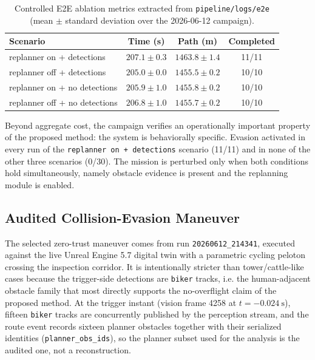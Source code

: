 \documentclass[a4paper,11pt]{article}
\begin{document}
\begin{table}[t]
    \centering
    \caption{Controlled E2E ablation metrics extracted from \texttt{pipeline/logs/e2e} (mean $\pm$ standard deviation over the 2026-06-12 campaign).}
    \label{tab:e2e}
    \small
    \begin{tabularx}{\linewidth}{@{}Y c c c@{}}
        \toprule
        \textbf{Scenario} & {\textbf{Time (s)}} & {\textbf{Path (m)}} & \textbf{Completed} \\
        \midrule
        replanner on + detections & $207.1 \pm 0.3$ & $1463.8 \pm 1.4$ & 11/11 \\
        replanner off + detections & $205.0 \pm 0.0$ & $1455.5 \pm 0.2$ & 10/10 \\
        replanner on + no detections & $205.9 \pm 1.0$ & $1455.8 \pm 0.2$ & 10/10 \\
        replanner off + no detections & $206.8 \pm 1.0$ & $1455.7 \pm 0.2$ & 10/10 \\
        \bottomrule
    \end{tabularx}
\end{table}

Beyond aggregate cost, the campaign verifies an operationally important property of the proposed method: the system is behaviorally specific. Evasion activated in every run of the \texttt{replanner on + detections} scenario (11/11) and in none of the other three scenarios (0/30). The mission is perturbed only when both conditions hold simultaneously, namely obstacle evidence is present and the replanning module is enabled.

\subsection{Audited Collision-Evasion Maneuver}

The selected zero-trust maneuver comes from run \texttt{20260612\_214341}, executed against the live Unreal Engine 5.7 digital twin with a parametric cycling peloton crossing the inspection corridor. It is intentionally stricter than tower/cattle-like cases because the trigger-side detections are \texttt{biker} tracks, i.e. the human-adjacent obstacle family that most directly supports the no-overflight claim of the proposed method. At the trigger instant (vision frame 4258 at \(t=-\SI{0.024}{\second}\)), fifteen \texttt{biker} tracks are concurrently published by the perception stream, and the route event records sixteen planner obstacles together with their serialized identities (\texttt{planner\_obs\_ids}), so the planner subset used for the analysis is the audited one, not a reconstruction.
\end{document}
